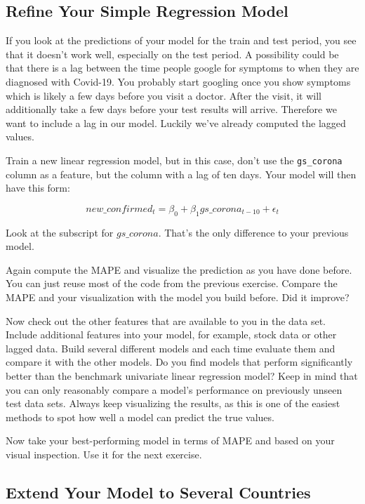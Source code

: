 \documentclass[
  11pt,
]{article}
\begin{document}
\hypertarget{refine-your-simple-regression-model}{%
\subsection{Refine Your Simple Regression Model}\label{refine-your-simple-regression-model}}

If you look at the predictions of your model for the train and test period, you see that it doesn't work well, especially on the test period. A possibility could be that there is a lag between the time people google for symptoms to when they are diagnosed with Covid-19. You probably start googling once you show symptoms which is likely a few days before you visit a doctor. After the visit, it will additionally take a few days before your test results will arrive. Therefore we want to include a lag in our model. Luckily we've already computed the lagged values.

Train a new linear regression model, but in this case, don't use the \texttt{gs\_corona} column as a feature, but the column with a lag of ten days. Your model will then have this form:

\[ new\_confirmed_t = \beta_0 + \beta_1 gs\_corona_{t-10} +\epsilon_t \]

Look at the subscript for \(gs\_corona\). That's the only difference to your previous model.

Again compute the MAPE and visualize the prediction as you have done before. You can just reuse most of the code from the previous exercise. Compare the MAPE and your visualization with the model you build before. Did it improve?

Now check out the other features that are available to you in the data set.
Include additional features into your model, for example, stock data or other lagged data. Build several different models and each time evaluate them and compare it with the other models. Do you find models that perform significantly better than the benchmark univariate linear regression model? Keep in mind that you can only reasonably compare a model's performance on previously unseen test data sets.
Always keep visualizing the results, as this is one of the easiest methods to spot how well a model can predict the true values.

Now take your best-performing model in terms of MAPE and based on your visual inspection. Use it for the next exercise.

\hypertarget{extend-your-model-to-several-countries}{%
\subsection{Extend Your Model to Several Countries}\label{extend-your-model-to-several-countries}}
\end{document}
